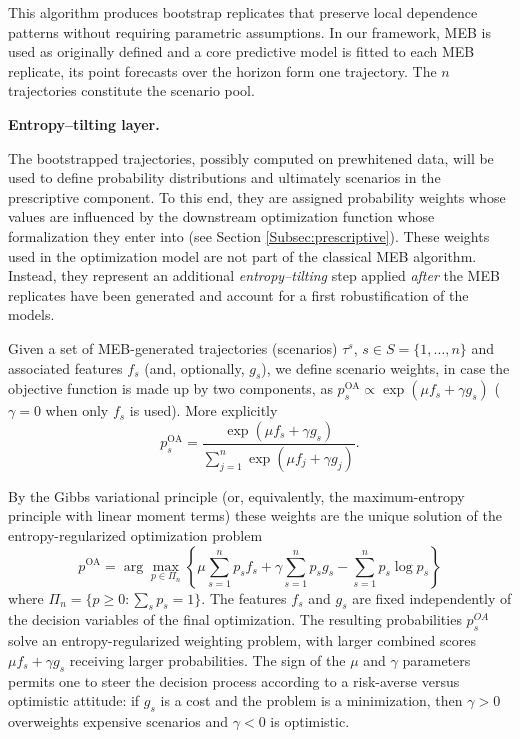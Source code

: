 \documentclass[mnsc,sglanonrev]{informs4}  %
\theoremstyle{remark}\newtheorem{remark}{Remark}
\begin{document}
This algorithm produces bootstrap replicates that preserve local dependence patterns without requiring parametric assumptions. In our framework, MEB is used as originally defined and a core predictive model is fitted to each MEB replicate, its point forecasts over the horizon form one trajectory. The $n$ trajectories constitute the scenario pool.

\vspace{0.2cm}
\noindent\textbf{Entropy–tilting layer.}

The bootstrapped trajectories, possibly computed on prewhitened data, will be used to define probability distributions and ultimately scenarios in the prescriptive component. To this end, they are assigned probability weights whose values are influenced by the downstream optimization function whose formalization they enter into (see Section \ref{Subsec:prescriptive}). These  weights used in the optimization model are not part of the classical MEB algorithm. Instead, they represent an additional \emph{entropy–tilting} step applied \emph{after} the MEB replicates have been generated and account for a first robustification of the models. 

Given a set of MEB-generated trajectories (scenarios) $\tau^s$, $s \in S = \{1, \ldots,n\}$ and associated features $f_s$ (and, optionally, $g_s$), we define scenario weights, in case the objective function is made up by two components, as $ p_s^{\mathrm{OA}} \propto \exp\!\left( \mu f_s + \gamma g_s \right) $ ($\gamma = 0$ when only $f_s$ is used).
More explicitly
\begin{equation}
p_s^{\mathrm{OA}} =
\frac{\exp(\mu f_s+\gamma g_s)}
{\sum_{j=1}^{n}\exp(\mu f_j+\gamma g_j)}.
\label{eq:tilting1}
\end{equation}

By the Gibbs variational principle (or, equivalently, the maximum-entropy principle with linear moment terms) these weights are the unique solution of the entropy-regularized optimization problem \citep{J57,BV04}
\begin{equation}
p^{\mathrm{OA}} =
  \arg\max_{p\in\Pi_n}
     \left\{ \mu\sum_{s=1}^{n}p_sf_s +\gamma\sum_{s=1}^{n}p_sg_s -\sum_{s=1}^{n}p_s\log p_s \right\}
\end{equation}
where $\Pi_n=\{p\ge0:\textstyle\sum_s p_s=1\}$. The features $f_s$ and $g_s$ are fixed independently of the decision variables of the final optimization. The resulting probabilities $p_s^{OA}$ solve an entropy-regularized weighting problem, with larger combined scores $\mu f_s+\gamma g_s$ receiving larger probabilities. The sign of the $\mu$ and $\gamma$ parameters permits one to steer the decision process according to a risk-averse versus optimistic attitude: if $g_s$ is a cost and the problem is a minimization, then $\gamma > 0$ overweights expensive scenarios and $\gamma < 0$ is optimistic.
\end{document}
